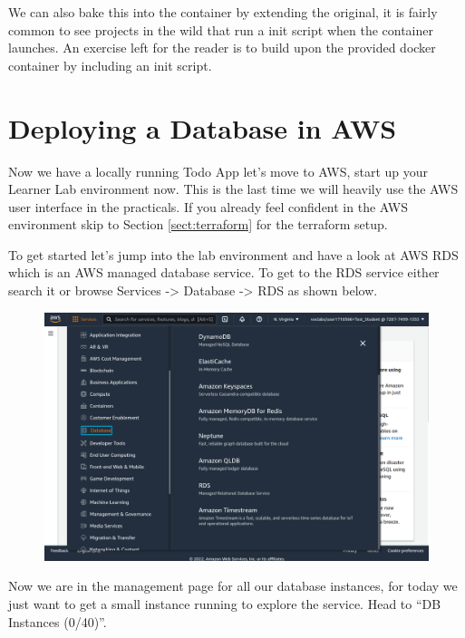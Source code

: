 \documentclass{csse4400}
\begin{document}
We can also bake this into the container by extending the original,
it is fairly common to see projects in the wild that run a init script when the container launches.
An exercise left for the reader is to build upon the provided docker container by including an init script.

\section{Deploying a Database in AWS}

Now we have a locally running Todo App let's move to AWS,
start up your Learner Lab environment now.
This is the last time we will heavily use the AWS user interface in the practicals.
If you already feel confident in the AWS environment skip to Section \ref{sect:terraform} for the terraform setup.


To get started let's jump into the lab environment and have a look at AWS RDS which is an AWS managed database service.
To get to the RDS service either search it or browse Services -> Database -> RDS as shown below.

\begin{figure}[H]
\includegraphics[width=\textwidth]{images/aws_1}
\end{figure}

Now we are in the management page for all our database instances,
for today we just want to get a small instance running to explore the service.
Head to ``DB Instances (0/40)''.
\end{document}
